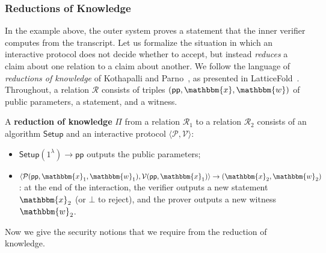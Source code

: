 \documentclass[../../book.tex]{subfiles}
\begin{document}
\subsubsection{Reductions of Knowledge}

In the example above, the outer system proves a statement that the inner verifier computes from the transcript.
Let us formalize the situation in which an interactive protocol does not decide whether to accept, but instead \emph{reduces} a claim about one relation to a claim about another.
We follow the language of \emph{reductions of knowledge} of Kothapalli and Parno~\cite{C:KotPar23}, as presented in LatticeFold~\cite{EPRINT:BonChe24}.
Throughout, a relation $\mathcal{R}$ consists of triples $(\mathsf{pp}, \mathbbm{x}, \mathbbm{w})$ of public parameters, a statement, and a witness.

\begin{definition}\label{def:reduction-of-knowledge}
    A \textbf{reduction of knowledge} $\Pi$ from a relation $\mathcal{R}_1$ to a relation $\mathcal{R}_2$ consists of an algorithm $\mathsf{Setup}$ and an interactive protocol $\langle \mathcal{P}, \mathcal{V} \rangle$:
    \begin{itemize}
        \item $\mathsf{Setup}(1^{\lambda}) \to \mathsf{pp}$ outputs the public parameters;
        \item $\langle \mathcal{P}(\mathsf{pp}, \mathbbm{x}_1, \mathbbm{w}_1), \mathcal{V}(\mathsf{pp}, \mathbbm{x}_1) \rangle \to (\mathbbm{x}_2, \mathbbm{w}_2)$: at the end of the interaction, the verifier outputs a new statement $\mathbbm{x}_2$ (or $\bot$ to reject), and the prover outputs a new witness $\mathbbm{w}_2$.
    \end{itemize}
\end{definition}

Now we give the security notions that we require from the reduction of knowledge.
\end{document}
